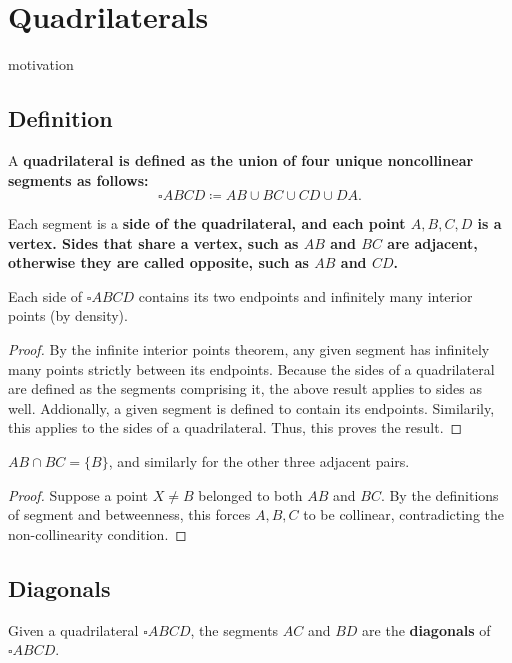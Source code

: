 \documentclass[../../../main/main.tex]{subfiles}
\begin{document}
\chapter{Quadrilaterals}

motivation

\section{Definition}

A \bf{quadrilateral} is defined as the union of four unique noncollinear segments as follows:
\[
\square ABCD \coloneq AB \cup BC \cup CD \cup DA.
\]

Each segment is a \bf{side} of the quadrilateral, and each point $A, B, C, D$ is a \bf{vertex}. Sides that share a vertex, such as $AB$ and $BC$ are adjacent, otherwise they are called opposite, such as $AB$ and $CD$.

\begin{theorem}
    Each side of $\square ABCD$ contains its two endpoints and infinitely many interior points (by density).
\end{theorem}
\begin{proof}
    By the infinite interior points theorem, any given segment has infinitely many points strictly between its endpoints. Because the sides of a quadrilateral are defined as the segments comprising it, the above result applies to sides as well. Addionally, a given segment is defined to contain its endpoints. Similarily, this applies to the sides of a quadrilateral. Thus, this proves the result.
\end{proof}

\begin{theorem}
    $AB \cap BC = \{B\}$, and similarly for the other three adjacent pairs.
\end{theorem}
\begin{proof}
    Suppose a point $X \neq B$ belonged to both $AB$ and $BC$. By the definitions of segment and betweenness, this forces $A, B, C$ to be collinear, contradicting the non-collinearity condition.
\end{proof}

\section{Diagonals}

\begin{definition}
    Given a quadrilateral $\square ABCD$, the segments $AC$ and $BD$ are the \textbf{diagonals} of $\square ABCD$.
\end{definition}
\end{document}

